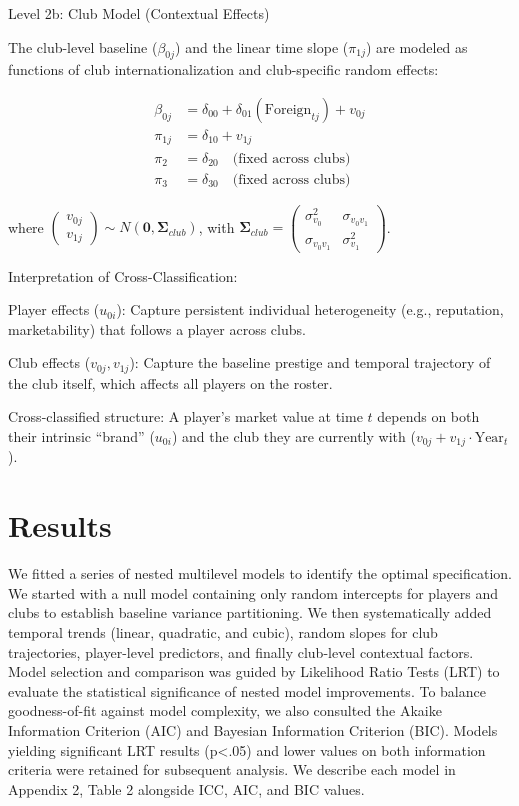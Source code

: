 \documentclass[
  12pt]{article}
\begin{document}
Level 2b: Club Model (Contextual Effects)

The club-level baseline (\(\beta_{0j}\)) and the linear time slope
(\(\pi_{1j}\)) are modeled as functions of club internationalization and
club-specific random effects:

\[
\begin{aligned}
\beta_{0j} &= \delta_{00} + \delta_{01}(\text{Foreign}_{tj}) + v_{0j} \\
\pi_{1j} &= \delta_{10} + v_{1j} \\
\pi_{2} &= \delta_{20} \quad \text{(fixed across clubs)} \\
\pi_{3} &= \delta_{30} \quad \text{(fixed across clubs)}
\end{aligned}
\]

where
\(\begin{pmatrix} v_{0j} \\ v_{1j} \end{pmatrix} \sim N \left( \mathbf{0}, \boldsymbol{\Sigma}_{club} \right)\),
with
\(\boldsymbol{\Sigma}_{club} = \begin{pmatrix} \sigma^2_{v_0} & \sigma_{v_0v_1} \\ \sigma_{v_0v_1} & \sigma^2_{v_1} \end{pmatrix}\).

Interpretation of Cross-Classification:

Player effects (\(u_{0i}\)): Capture persistent individual heterogeneity
(e.g., reputation, marketability) that follows a player across clubs.

Club effects (\(v_{0j}, v_{1j}\)): Capture the baseline prestige and
temporal trajectory of the club itself, which affects all players on the
roster.

Cross-classified structure: A player's market value at time \(t\)
depends on both their intrinsic ``brand'' (\(u_{0i}\)) and the club they
are currently with (\(v_{0j} + v_{1j} \cdot \text{Year}_t\)).

\section{Results}\label{results}

We fitted a series of nested multilevel models to identify the optimal
specification. We started with a null model containing only random
intercepts for players and clubs to establish baseline variance
partitioning. We then systematically added temporal trends (linear,
quadratic, and cubic), random slopes for club trajectories, player-level
predictors, and finally club-level contextual factors. Model selection
and comparison was guided by Likelihood Ratio Tests (LRT) to evaluate
the statistical significance of nested model improvements. To balance
goodness-of-fit against model complexity, we also consulted the Akaike
Information Criterion (AIC) and Bayesian Information Criterion (BIC).
Models yielding significant LRT results (p\textless.05) and lower values
on both information criteria were retained for subsequent analysis. We
describe each model in Appendix 2, Table 2 alongside ICC, AIC, and BIC
values.
\end{document}
